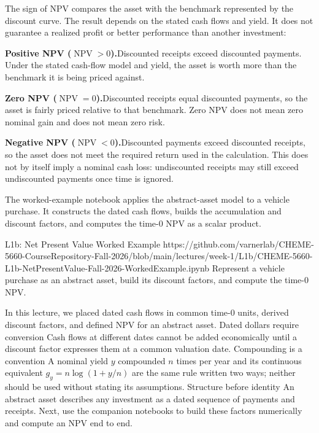 \documentclass[11pt]{article}
\begin{document}
The sign of NPV compares the asset with the benchmark represented by the discount curve. The result depends on the stated cash flows and yield. It does not guarantee a realized profit or better performance than another investment:

\textbf{Positive NPV ($\operatorname{NPV}>0$).}\enspace Discounted receipts exceed discounted payments. Under the stated cash-flow model and yield, the asset is worth more than the benchmark it is being priced against.

\textbf{Zero NPV ($\operatorname{NPV}=0$).}\enspace Discounted receipts equal discounted payments, so the asset is fairly priced relative to that benchmark. Zero NPV does not mean zero nominal gain and does not mean zero risk.

\textbf{Negative NPV ($\operatorname{NPV}<0$).}\enspace Discounted payments exceed discounted receipts, so the asset does not meet the required return used in the calculation. This does not by itself imply a nominal cash loss: undiscounted receipts may still exceed undiscounted payments once time is ignored.

The worked-example notebook applies the abstract-asset model to a vehicle purchase. It constructs the dated cash flows, builds the accumulation and discount factors, and computes the time-0 NPV as a scalar product.

\notebooklink
  {L1b: Net Present Value Worked Example}
  {https://github.com/varnerlab/CHEME-5660-CourseRepository-Fall-2026/blob/main/lectures/week-1/L1b/CHEME-5660-L1b-NetPresentValue-Fall-2026-WorkedExample.ipynb}
  {Represent a vehicle purchase as an abstract asset, build its discount factors, and compute the time-0 NPV.}

\thispagestyle{fancy}
\keytakeaways
  {In this lecture, we placed dated cash flows in common time-0 units, derived discount factors, and defined NPV for an abstract asset.}
  {Dated dollars require conversion}
  {Cash flows at different dates cannot be added economically until a discount factor expresses them at a common valuation date.}
  {Compounding is a convention}
  {A nominal yield $y$ compounded $n$ times per year and its continuous equivalent $g_y=n\log(1+y/n)$ are the same rule written two ways; neither should be used without stating its assumptions.}
  {Structure before identity}
  {An abstract asset describes any investment as a dated sequence of payments and receipts.}
  {Next, use the companion notebooks to build these factors numerically and compute an NPV end to end.}
\end{document}
